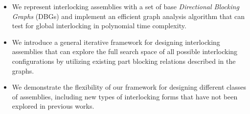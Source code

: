 
\begin{itemize}[leftmargin=*]
\item 
We represent interlocking assemblies with a set of base {\em Directional Blocking Graphs} (DBGs) and implement an efficient graph analysis algorithm that can test for global interlocking in polynomial time complexity.



\vspace*{1.0mm}
\item  
We introduce a general iterative framework for designing interlocking assemblies that can explore the full search space of all possible interlocking configurations by utilizing existing part blocking relations described in the graphs.

\vspace*{1.0mm}
\item We demonstrate the flexibility of our framework for designing different classes of assemblies, including new types of interlocking forms that have not been explored in previous works.

 \end{itemize}

\noindent

